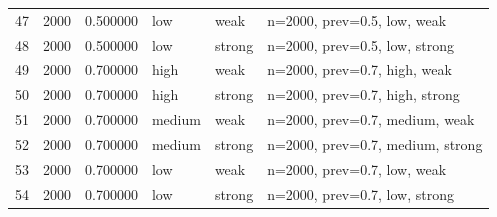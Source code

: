 \begin{tabular}{rrrlll}
47 & 2000 & 0.500000 & low & weak & n=2000, prev=0.5, low, weak \\
48 & 2000 & 0.500000 & low & strong & n=2000, prev=0.5, low, strong \\
49 & 2000 & 0.700000 & high & weak & n=2000, prev=0.7, high, weak \\
50 & 2000 & 0.700000 & high & strong & n=2000, prev=0.7, high, strong \\
51 & 2000 & 0.700000 & medium & weak & n=2000, prev=0.7, medium, weak \\
52 & 2000 & 0.700000 & medium & strong & n=2000, prev=0.7, medium, strong \\
53 & 2000 & 0.700000 & low & weak & n=2000, prev=0.7, low, weak \\
54 & 2000 & 0.700000 & low & strong & n=2000, prev=0.7, low, strong \\
\bottomrule
\end{tabular}
